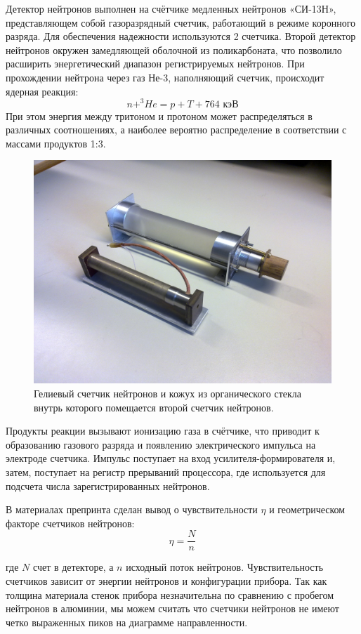 Детектор нейтронов выполнен на счётчике медленных нейтронов «СИ-13Н», представляющем собой газоразрядный  счетчик, работающий в режиме коронного разряда. Для обеспечения надежности используются 2 счетчика. Второй детектор нейтронов окружен замедляющей оболочной из поликарбоната, что позволило расширить энергетический диапазон регистрируемых нейтронов. При прохождении нейтрона через газ Не-3, наполняющий счетчик, происходит ядерная реакция:
\[ n+^3\!He = p+T+764 \textrm{ кэВ}\]
При этом энергия между тритоном и протоном может распределяться в различных соотношениях, а наиболее вероятно распределение в соответствии с массами продуктов 1:3.
\begin{figure}
\centering
\includegraphics[width=0.7\linewidth]{images/04062010072}
\caption{Гелиевый счетчик нейтронов и кожух из органического стекла внутрь которого помещается второй счетчик нейтронов.}
\label{fig:04062010072}
\end{figure}


Продукты реакции вызывают ионизацию газа в счётчике, что приводит к образованию газового разряда и появлению электрического импульса на электроде счетчика. Импульс поступает на вход усилителя-формирователя и, затем, поступает на регистр прерываний процессора, где используется для подсчета числа зарегистрированных нейтронов.
\cite{Shavrin2002}

В материалах препринта \cite{Shavrin1990} сделан вывод о чувствительности $ \eta $ и геометрическом факторе счетчиков нейтронов: 
\begin{equation}\label{eq:sens}
 \eta = \frac{N}{n} 
\end{equation}

где $ N $ счет в детекторе, а $ n $ исходный поток нейтронов. Чувствительность счетчиков зависит от энергии нейтронов и конфигурации прибора. Так как толщина материала стенок прибора незначительна по сравнению с пробегом нейтронов в алюминии, мы можем считать что счетчики нейтронов не имеют четко выраженных пиков на диаграмме направленности.

